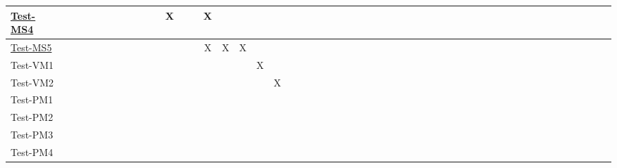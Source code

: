 \documentclass[12pt, titlepage]{article}
\begin{document}
\begin{landscape}
\begin{table}[H]
\begin{adjustwidth}{-0.1in}{-1in}
{\begin{tabular}{c|c|c|c|c|c|c|c|c|c|c|c|c|c|c|c|c|c|c|c|c|c|c|c|c|c|c|c|c|c|c|c|c|c|c|c|c|c|c|c|c|c|c|c|c|c|c|c|c|c|c|c|}
\multicolumn{1}{|l|}{\hyperref[itm:Test-MS4]{Test-MS4}}    &             &              &             &             &             &             &              &              &             &             &        X      &             &              &    X        &        & &&&&&&&&&&&&&&&&&&&&&&&&&&&&&&&&&&&\\ \hline
\multicolumn{1}{|l|}{\hyperref[itm:Test-MS5]{Test-MS5}}  &             &              &             &             &             &             &              &              &             &             &              &             &             &       X       &  X      & X&&&&&&&&&&&&&&&&&&&&&&&&&&&&&&&&&&&\\ \hline
\multicolumn{1}{|l|}{{Test-VM1}}   &             &              &             &            &             &             &             &             &              &              &             &             &              &             &              &                &X&&&&&&&&&&&&&&&&&&&&&&&&&&&&&&&&&&\\ \hline
\multicolumn{1}{|l|}{{Test-VM2}}   &             &              &             &            &             &             &             &             &              &              &             &             &              &             &              &                &&X&&&&&&&&&&&&&&&&&&&&&&&&&&&&&&&&&\\ \hline
\multicolumn{1}{|l|}{{Test-PM1}}   &             &              &             &            &             &             &             &             &              &              &             &             &              &             &              &                &&&&&&&&&&&&&&&&&&&&&&&&&&&&&&&&&&&\\ \hline
\multicolumn{1}{|l|}{{Test-PM2}}   &             &              &             &            &             &             &             &             &              &              &             &             &              &             &              &                &&&&&&&&&&&&&&&&&&&&&&&&&&&&&&&&&&&\\ \hline
\multicolumn{1}{|l|}{{Test-PM3}}   &             &              &             &            &             &             &             &             &              &              &             &             &              &             &              &                &&&&&&&&&&&&&&&&&&&&&&&&&&&&&&&&&&&\\ \hline
\multicolumn{1}{|l|}{{Test-PM4}}   &             &              &             &            &             &             &             &             &              &              &             &             &              &             &              &                &&&&&&&&&&&&&&&&&&&&&&&&&&&&&&&&&&&\\ \hline

\end{tabular}}
\end{adjustwidth}
\end{table}
\end{landscape}
\end{document}
